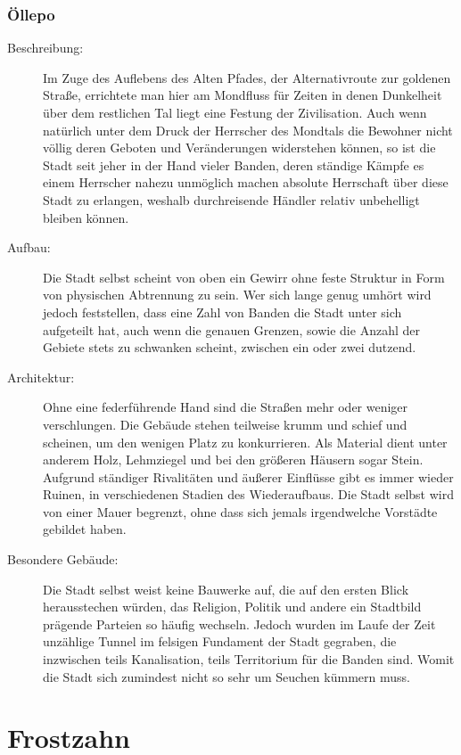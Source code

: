 \documentclass[a4paper,12pt,oneside]{book}
\begin{document}
\subsection{Öllepo}
\begin{description}
\item[Beschreibung:]Im Zuge des Auflebens des Alten Pfades, der Alternativroute zur goldenen Straße, errichtete man hier am Mondfluss für Zeiten in denen Dunkelheit über dem restlichen Tal liegt eine Festung der Zivilisation. Auch wenn natürlich unter dem Druck der Herrscher des Mondtals die Bewohner nicht völlig deren Geboten und Veränderungen widerstehen können, so ist die Stadt seit jeher in der Hand vieler Banden, deren ständige Kämpfe es einem Herrscher nahezu unmöglich machen absolute Herrschaft über diese Stadt zu erlangen, weshalb durchreisende Händler relativ unbehelligt bleiben können.
\item[Aufbau:]Die Stadt selbst scheint von oben ein Gewirr ohne feste Struktur in Form von physischen Abtrennung zu sein. Wer sich lange genug umhört wird jedoch feststellen, dass eine Zahl von Banden die Stadt unter sich aufgeteilt hat, auch wenn die genauen Grenzen, sowie die Anzahl der Gebiete stets zu schwanken scheint, zwischen ein oder zwei dutzend.
\item[Architektur:]Ohne eine federführende Hand sind die Straßen mehr oder weniger verschlungen. Die Gebäude stehen teilweise krumm und schief und scheinen, um den wenigen Platz zu konkurrieren. Als Material dient unter anderem Holz, Lehmziegel und bei den größeren Häusern sogar Stein. Aufgrund ständiger Rivalitäten und äußerer Einflüsse gibt es immer wieder Ruinen, in verschiedenen Stadien des Wiederaufbaus. Die Stadt selbst wird von einer Mauer begrenzt, ohne dass sich jemals irgendwelche Vorstädte gebildet haben.
\item[Besondere Gebäude:]Die Stadt selbst weist keine Bauwerke auf, die auf den ersten Blick herausstechen würden, das Religion, Politik und andere ein Stadtbild prägende Parteien so häufig wechseln. Jedoch wurden im Laufe der Zeit unzählige Tunnel im felsigen Fundament der Stadt gegraben, die inzwischen teils Kanalisation, teils Territorium für die Banden sind. Womit die Stadt sich zumindest nicht so sehr um Seuchen kümmern muss. 
\end{description}

\chapter{Frostzahn}
\end{document}
